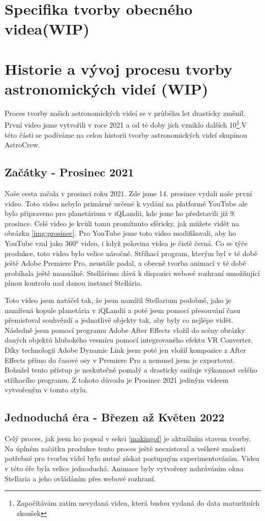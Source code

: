 \documentclass[12pt,a4paper,titlepage]{article}
\begin{document}
\section{Specifika tvorby obecného videa(WIP)}
\section{Historie a vývoj procesu tvorby astronomických videí (WIP)}
Proces tvorby našich astronomických videí se v průběhu let drasticky změnil. První video jsme vytvořili v roce 2021 a od té doby jich vzniklo dalších 10\footnote{Započítávám zatím nevydaná videa, která budou vydaná do data maturitních zkoušek}.V této části se podíváme na celou historii tvorby astronomických videí skupinou AstroCrew.
\subsection{Začátky - Prosinec 2021}
Naše cesta začala v prosinci roku 2021. Zde jsme 14. prosince vydali naše první video. Toto video nebylo primárně určené k vydání na platformě YouTube ale bylo připraveno pro planetárium v iQLandii, kde jsme ho představili již 9. prosince. Celé video je kvůli tomu promítnuto sféricky, jak můžete vidět na obrázku \ref{img:prosinec}. Pro YouTube jsme toto video modifikovali, aby ho YouTube vzal jako 360° video, i když polovina videa je čistě černá. Co se týče produkce, toto video bylo velice náročné. Stříhací program, kterým byl v té době ještě Adobe Premiere Pro, neustále padal, a obecně tvorba animací v té době probíhala ještě manuálně. Stellárium dává k dispozici webové rozhraní umožňující plnou kontrolu nad danou instancí Stellária. 

Toto video jsem natáčel tak, že jsem namířil Stellarium podobně, jako je namířená kopule planetária v iQLandii a poté jsem pomocí přesouvání času přemisťoval souhvězdí a jednotlivé objekty tak, aby byly co nejlépe vidět. Následně jsem pomocí programu Adobe After Effects vložil do scény obrázky daných objektů hlubokého vesmíru pomocí integrovaného efektu VR Converter. Díky technologii Adobe Dynamic Link jsem poté jen vložil kompozice z After Effects přímo do časové osy v Premiere Pro a nemusel jsem je exportovat. Bohužel tento přístup je neskutečně pomalý a drasticky snižuje výkonnost celého stříhacího programu. Z tohoto důvodu je Prosinec 2021 jediným videem vytvořeným v tomto stylu.
\subsection{Jednoduchá éra - Březen až Květen 2022}
Celý proces, jak jsem ho popsal v sekci \ref{makingof} je aktuálním stavem tvorby. Na úplném začátku produkce tento proces ještě neexistoval a veškeré znalosti potřebné pro tvorbu  videí bylo nutné získat postupným experimentováním. Videa v této éře byla velice jednoduchá. Animace byly vytvořeny nahráváním okna Stellaria a jeho ovládáním přes webové rozhraní. 
\end{document}
